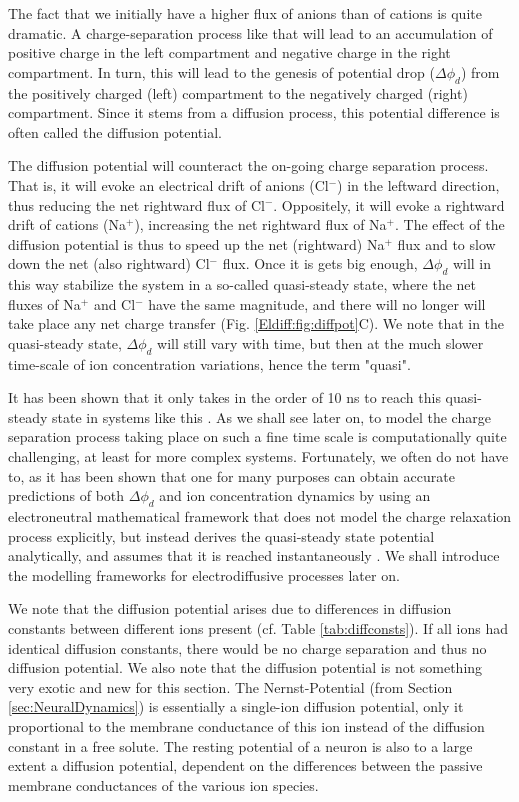 The fact that we initially have a higher flux of anions than of cations is quite dramatic. A charge-separation process like that will lead to an accumulation of positive charge in the left compartment and negative charge in the right compartment. In turn, this will lead to the genesis of potential drop ($\Delta \phi_d$) from the positively charged (left) compartment to the negatively charged (right) compartment. Since it stems from a diffusion process, this potential difference is often called the diffusion potential. 

The diffusion potential will counteract the on-going charge separation process. That is, it will evoke an electrical drift of anions (Cl$^-$) in the leftward direction, thus reducing the net rightward flux of Cl$^-$. Oppositely, it will evoke a rightward drift of cations (Na$^+$), increasing the net rightward flux of Na$^+$. The effect of the diffusion potential is thus to speed up the net (rightward) Na$^+$ flux and to slow down the net (also rightward) Cl$^-$ flux. Once it is gets big enough, $\Delta \phi_d$ will in this way stabilize the system in a so-called quasi-steady state, where the net fluxes of Na$^+$ and Cl$^-$ have the same magnitude, and there will no longer will take place any net charge transfer (Fig. \ref{Eldiff:fig:diffpot}C). We note that in the quasi-steady state, $\Delta \phi_d$ will still vary with time, but then at the much slower time-scale of ion concentration variations, hence the term "quasi".

It has been shown that it only takes in the order of 10 ns to reach this quasi-steady state in systems like this \cite{Solbra2018}. As we shall see later on, to model the charge separation process taking place on such a fine time scale is computationally quite challenging, at least for more complex systems. Fortunately, we often do not have to, as it has been shown that one for many purposes can obtain accurate predictions of both $\Delta \phi_d$ and ion concentration dynamics by using an electroneutral mathematical framework that does not model the charge relaxation process explicitly, but instead derives the quasi-steady state potential analytically, and assumes that it is reached instantaneously \cite{Solbra2018}. We shall introduce the modelling frameworks for electrodiffusive processes later on.

We note that the diffusion potential arises due to differences in diffusion constants between different ions present  (cf. Table \ref{tab:diffconsts}). If all ions had identical diffusion constants, there would be no charge separation and thus no diffusion potential. We also note that the diffusion potential is not something very exotic and new for this section. The Nernst-Potential (from Section \ref{sec:NeuralDynamics}) is essentially a single-ion diffusion potential, only it proportional to the membrane conductance of this ion instead of the diffusion constant in a free solute. The resting potential of a neuron is also to a large extent a diffusion potential, dependent on the differences between the passive membrane conductances of the various ion species.

